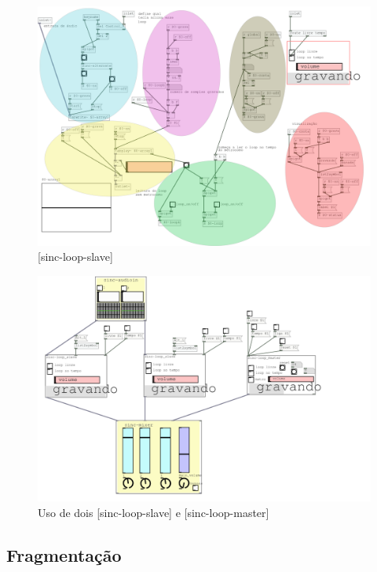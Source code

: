 \documentclass{ppgmus}
\begin{document}
\begin{figure}
\includegraphics[scale=.2]{loop-slave}
\caption{[sinc-loop-slave]}
\label{loopslave}
\end{figure}

\begin{figure}
\includegraphics[scale=.6]{loop-help}
\caption{Uso de dois [sinc-loop-slave] e [sinc-loop-master]}
\label{loophelp}
\end{figure}


\subsection {Fragmentação}
\end{document}
